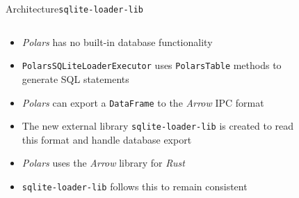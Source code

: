 \begin{frame}[t]{Architecture}{\Verb|sqlite-loader-lib|}
	\begin{columns}[T]
		\begin{column}{0.5\linewidth}
			\begin{itemize}[<+(1)->]
				\item \emph{Polars} has no built-in database functionality
				\item \Verb|PolarsSQLiteLoaderExecutor| uses \Verb|PolarsTable| methods to generate SQL statements
				\item \emph{Polars} can export a \Verb|DataFrame| to the \emph{Arrow} IPC format
				\item The new external library \Verb|sqlite-loader-lib| is created to read this format and handle database export
				\item \emph{Polars} uses the \emph{Arrow} library for \emph{Rust}
				\item \Verb|sqlite-loader-lib| follows this to remain consistent
			\end{itemize}
		\end{column}
		\begin{column}{0.5\linewidth}
			\begin{figure}
			\end{figure}
		\end{column}
	\end{columns}
\end{frame}
